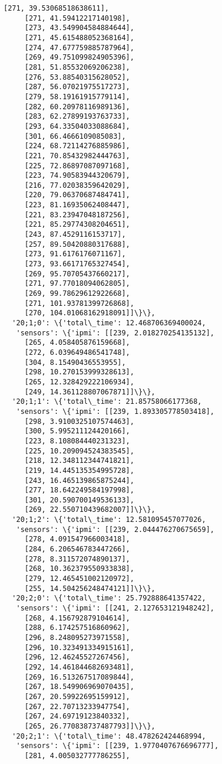 \documentclass[11pt]{article}
\begin{document}
\begin{tcolorbox}[breakable, size=fbox, boxrule=.5pt, pad at break*=1mm, opacityfill=0]
\begin{Verbatim}[commandchars=\\\{\}]
     [271, 39.53068518638611],
     [271, 41.59412217140198],
     [273, 43.549904584884644],
     [271, 45.615488052368164],
     [274, 47.677759885787964],
     [269, 49.751099824905396],
     [281, 51.85532069206238],
     [276, 53.88540315628052],
     [287, 56.07021975517273],
     [279, 58.19161915779114],
     [282, 60.20978116989136],
     [283, 62.27899193763733],
     [293, 64.33504033088684],
     [301, 66.4666109085083],
     [224, 68.72114276885986],
     [221, 70.85432982444763],
     [225, 72.86897087097168],
     [223, 74.90583944320679],
     [216, 77.02038359642029],
     [220, 79.06370687484741],
     [223, 81.16935062408447],
     [221, 83.23947048187256],
     [221, 85.29774308204651],
     [243, 87.4529116153717],
     [257, 89.50420880317688],
     [273, 91.6176176071167],
     [273, 93.66171765327454],
     [269, 95.70705437660217],
     [271, 97.77018094062805],
     [269, 99.78629612922668],
     [271, 101.93781399726868],
     [270, 104.01068162918091]]\}\},
  '20;1;0': \{'total\_time': 12.468706369400024,
   'sensors': \{'ipmi': [[239, 2.018270254135132],
     [265, 4.058405876159668],
     [272, 6.039649486541748],
     [304, 8.15490436553955],
     [298, 10.270153999328613],
     [265, 12.328429222106934],
     [249, 14.361128807067871]]\}\},
  '20;1;1': \{'total\_time': 21.85758066177368,
   'sensors': \{'ipmi': [[239, 1.893305778503418],
     [298, 3.9100325107574463],
     [300, 5.995211124420166],
     [223, 8.108084440231323],
     [225, 10.209094524383545],
     [218, 12.348112344741821],
     [219, 14.445135354995728],
     [243, 16.465139865875244],
     [277, 18.642249584197998],
     [301, 20.590700149536133],
     [269, 22.550710439682007]]\}\},
  '20;1;2': \{'total\_time': 12.581095457077026,
   'sensors': \{'ipmi': [[239, 2.044476270675659],
     [278, 4.091547966003418],
     [284, 6.206546783447266],
     [278, 8.311572074890137],
     [268, 10.362379550933838],
     [279, 12.465451002120972],
     [255, 14.504256248474121]]\}\},
  '20;2;0': \{'total\_time': 25.792888641357422,
   'sensors': \{'ipmi': [[241, 2.127653121948242],
     [268, 4.156792879104614],
     [288, 6.174257516860962],
     [296, 8.248095273971558],
     [296, 10.323491334915161],
     [296, 12.46245527267456],
     [292, 14.461844682693481],
     [269, 16.513267517089844],
     [267, 18.549906969070435],
     [267, 20.59922695159912],
     [267, 22.70713233947754],
     [267, 24.69719123840332],
     [265, 26.770838737487793]]\}\},
  '20;2;1': \{'total\_time': 48.478262424468994,
   'sensors': \{'ipmi': [[239, 1.9770407676696777],
     [281, 4.005032777786255],

\end{Verbatim}
\end{tcolorbox}
\end{document}
